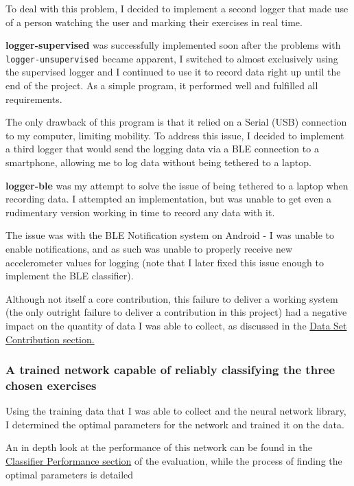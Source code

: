 \documentclass[a4paper]{article}
\begin{document}
To deal with this problem, I decided to implement a second logger that made use of a person watching the user and marking their exercises in real time.

\textbf{logger-supervised} was successfully implemented soon after the problems with \lstinline{logger-unsupervised} became apparent, I switched to almost exclusively using the supervised logger and I continued to use it to record data right up until the end of the project. As a simple program, it performed well and fulfilled all requirements.

The only drawback of this program is that it relied on a Serial (USB) connection to my computer, limiting mobility. To address this issue, I decided to implement a third logger that would send the logging data via a BLE connection to a smartphone, allowing me to log data without being tethered to a laptop.

\label{para:ev_cl_loggerble}
\textbf{logger-ble} was my attempt to solve the issue of being tethered to a laptop when recording data. I attempted an implementation, but was unable to get even a rudimentary version working in time to record any data with it.

The issue was with the BLE Notification system on Android - I was unable to enable notifications, and as such was unable to properly receive new accelerometer values for logging (note that I later fixed this issue enough to implement the BLE classifier).

Although not itself a core contribution, this failure to deliver a working system (the only outright failure to deliver a contribution in this project) had a negative impact on the quantity of data I was able to collect, as discussed in the \hyperref[subsec:ev_ds]{Data Set Contribution section.}

\subsubsection{A trained network capable of reliably classifying the three chosen exercises}

Using the training data that I was able to collect and the neural network library, I determined the optimal parameters for the network and trained it on the data.

An in depth look at the performance of this network can be found in the \hyperref[subsec:ev_cp]{Classifier Performance section} of the evaluation, while the process of finding the optimal parameters is detailed 
\end{document}
